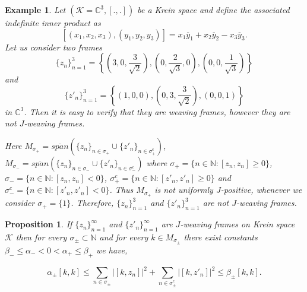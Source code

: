 \documentclass[article,12pt]{amsart}
\newtheorem{prop}[thm]{Proposition}
\newtheorem{ex}[thm]{Example}
\begin{document}
\begin{ex}

	
	
	Let $(\mathcal{K} = \mathbb{C}^3, [., .])$ be a Krein space and define the associated indefinite inner product as $$[(x_1, x_2, x_3), (y_1, y_2, y_3)] = x_1\overline y_1 + x_2\overline y_2 - x_3\overline y_3.$$
Let us consider two frames 
$$ 
\{z_n\}_{n =1}^3 = \left\{ \left(3, 0, \dfrac{3}{\sqrt{2}}\right), \left(0, \dfrac{2}{\sqrt{3}}, 0\right), \left(0, 0, \dfrac{1}{\sqrt{3}}\right)\right\}
$$ and 
$$
\{z'_n\}_{n =1}^3 = \left\{ \left(1, 0, 0\right), \left(0, 3, \dfrac{3}{\sqrt{2}}\right), \left(0, 0,1\right )\right\}
$$ in $\mathbb C^3$. Then it is easy to verify that they are weaving frames, however they are not $J$-weaving frames.
	
	Here  $M_{\sigma_+}  = \overline{span} (\{z_n\}_{n \in \sigma_+} \cup \{z'_n\}_{n \in \sigma^c_+})$, $M_{\sigma_-}  = \overline{span} (\{z_n\}_{n \in \sigma_-} \cup \{z'_n\}_{n \in \sigma^c_-})$ where $\sigma_+ =\{n \in \mathbb{N}  : [z_n, z_n]\geq0\}$, $\sigma_- =\{n\in\mathbb{N} : [z_n, z_n]< 0\}$,  
	$\sigma^c_+ =\{n\in\mathbb{N}  : [z'_n, z'_n]\geq0\}$ and $\sigma^c_- = \{n \in\mathbb{N}  : [ z'_n, z'_n]< 0\}$. Thus $M_{\sigma_+}$ is not uniformly $J$-positive, whenever we consider $\sigma_+ = \{1\}$. Therefore, $\{z_n\}_{n = 1}^3$ and $\{z'_n\}_{n = 1}^3$ are not $J$-weaving frames.
	
\end{ex}





\begin{prop}\label{2.18}
If $\{z_n\}^\infty_{n= 1}$ and $\{z'_n\}^\infty_{n= 1}$ are $J$-weaving frames on Krein space $\mathcal{K}$ then for every $ \sigma_{\pm} \subset{\mathbb{N}}$ and for every $k \in M_{\sigma_\pm}$ there exist constants $ \beta_{-} \leq  \alpha_- < 0 < \alpha_+ \leq \beta_{+}$ we have, 


\begin{equation}\label{19}
	\alpha_{\pm} [k, k]  \leq \sum\limits_{n \in \sigma_{\pm}} |[k, z_n]|^2 + \sum\limits_{n \in \sigma_{\pm}^c} |[k, z'_n]|^2 \leq \beta_{\pm} [k, k].
\end{equation}

\end{prop}
\end{document}
